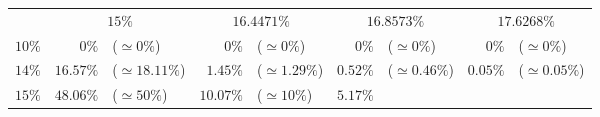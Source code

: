 \documentclass[10pt]{report}
\begin{document}
\begin{exercice}
\begin{center}
\begin{tabular}{|c|rl|rl|rl|rl|}
    
    
    
    
    
    
    \\ \cline{2-9}

    
        
         & 
    \multicolumn{2}{c|}{$15\%$}
     & 
    \multicolumn{2}{c|}{$16.4471\%$}
     & 
    \multicolumn{2}{c|}{$16.8573\%$}
     & 
    \multicolumn{2}{c|}{$17.6268\%$}
    
    \\ \cline{1-9}

    
        $10\%$
         & 
    
        $0\%$
         & 
    
        ($\simeq0\%$)
         & 
    
        $0\%$
         & 
    
        ($\simeq0\%$)
         & 
    
        $0\%$
         & 
    
        ($\simeq0\%$)
         & 
    
        $0\%$
         & 
    
        ($\simeq0\%$)
        
    \\ 

    
        $14\%$
         & 
    
        $16.57\%$
         & 
    
        ($\simeq18.11\%$)
         & 
    
        $1.45\%$
         & 
    
        ($\simeq1.29\%$)
         & 
    
        $0.52\%$
         & 
    
        ($\simeq0.46\%$)
         & 
    
        $0.05\%$
         & 
    
        ($\simeq0.05\%$)
        
    \\ 

    
        $15\%$
         & 
    
        $48.06\%$
         & 
    
        ($\simeq50\%$)
         & 
    
        $10.07\%$
         & 
    
        ($\simeq10\%$)
         & 
    
        $5.17\%$
         & 
    

\end{tabular}
\end{center}
\end{exercice}
\end{document}
